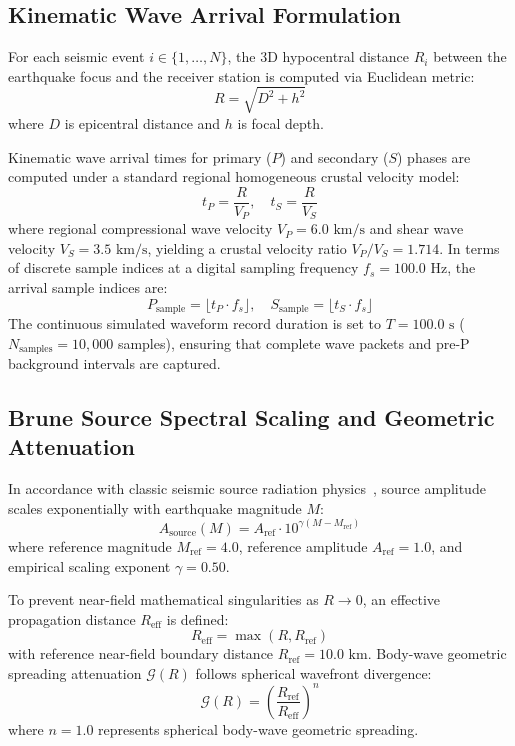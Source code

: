 \documentclass[journal]{IEEEtran}
\begin{document}
\subsection{Kinematic Wave Arrival Formulation}
For each seismic event $i \in \{1, \dots, N\}$, the 3D hypocentral distance $R_i$ between the earthquake focus and the receiver station is computed via Euclidean metric:
\begin{equation}
R = \sqrt{D^2 + h^2}
\label{eq:hypocentral_distance}
\end{equation}
where $D$ is epicentral distance and $h$ is focal depth. 

Kinematic wave arrival times for primary ($P$) and secondary ($S$) phases are computed under a standard regional homogeneous crustal velocity model:
\begin{equation}
t_P = \frac{R}{V_P}, \quad t_S = \frac{R}{V_S}
\label{eq:arrival_times}
\end{equation}
where regional compressional wave velocity $V_P = 6.0\text{ km/s}$ and shear wave velocity $V_S = 3.5\text{ km/s}$, yielding a crustal velocity ratio $V_P/V_S = 1.714$. In terms of discrete sample indices at a digital sampling frequency $f_s = 100.0\text{ Hz}$, the arrival sample indices are:
\begin{equation}
P_{\text{sample}} = \lfloor t_P \cdot f_s \rfloor, \quad S_{\text{sample}} = \lfloor t_S \cdot f_s \rfloor
\label{eq:arrival_samples}
\end{equation}
The continuous simulated waveform record duration is set to $T = 100.0\text{ s}$ ($N_{\text{samples}} = 10,000$ samples), ensuring that complete wave packets and pre-P background intervals are captured.

\subsection{Brune Source Spectral Scaling and Geometric Attenuation}
In accordance with classic seismic source radiation physics~\cite{brune1970tectonic}, source amplitude scales exponentially with earthquake magnitude $M$:
\begin{equation}
A_{\text{source}}(M) = A_{\text{ref}} \cdot 10^{\gamma (M - M_{\text{ref}})}
\label{eq:a_source}
\end{equation}
where reference magnitude $M_{\text{ref}} = 4.0$, reference amplitude $A_{\text{ref}} = 1.0$, and empirical scaling exponent $\gamma = 0.50$.

To prevent near-field mathematical singularities as $R \to 0$, an effective propagation distance $R_{\text{eff}}$ is defined:
\begin{equation}
R_{\text{eff}} = \max(R, R_{\text{ref}})
\label{eq:r_eff}
\end{equation}
with reference near-field boundary distance $R_{\text{ref}} = 10.0\text{ km}$. Body-wave geometric spreading attenuation $\mathcal{G}(R)$ follows spherical wavefront divergence:
\begin{equation}
\mathcal{G}(R) = \left( \frac{R_{\text{ref}}}{R_{\text{eff}}} \right)^n
\label{eq:geom}
\end{equation}
where $n = 1.0$ represents spherical body-wave geometric spreading.
\end{document}
